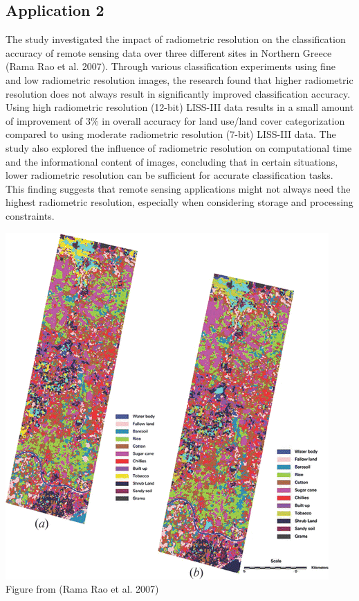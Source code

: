 \documentclass[
  letterpaper,
  DIV=11,
  numbers=noendperiod]{scrreprt}
\begin{document}
\subsection{Application 2}\label{application-2}

The study investigated the impact of radiometric resolution on the
classification accuracy of remote sensing data over three different
sites in Northern Greece (Rama Rao et al. 2007). Through various
classification experiments using fine and low radiometric resolution
images, the research found that higher radiometric resolution does not
always result in significantly improved classification accuracy. Using
high radiometric resolution (12-bit) LISS-III data results in a small
amount of improvement of 3\% in overall accuracy for land use/land cover
categorization compared to using moderate radiometric resolution (7-bit)
LISS-III data. The study also explored the influence of radiometric
resolution on computational time and the informational content of
images, concluding that in certain situations, lower radiometric
resolution can be sufficient for accurate classification tasks. This
finding suggests that remote sensing applications might not always need
the highest radiometric resolution, especially when considering storage
and processing constraints.

\includegraphics{LISS_3.jpg} Figure from (Rama Rao et al. 2007)
\end{document}
